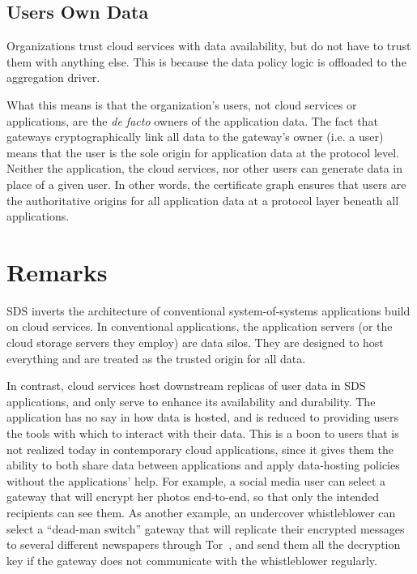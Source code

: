 \subsection{Users Own Data}

Organizations trust cloud services with data availability, but do not have to
trust them with anything else.  This is because the data policy logic is
offloaded to the aggregation driver.

What this means is that the organization's users, not cloud services or
applications, are the \emph{de facto} owners of the application data.  The fact that
gateways cryptographically link all data to the gateway's owner (i.e. a user) 
means that the user is the sole origin for
application data at the protocol level.
Neither the application, the cloud services, nor other users
can generate data in place of a given user.  In other words, the certificate
graph ensures that users are the authoritative origins for all application data
at a protocol layer beneath all applications.

\section{Remarks}

SDS inverts the architecture of conventional system-of-systems applications
build on cloud services.  In conventional
applications, the application servers (or the cloud storage servers they employ)
are data silos.  They are designed to
host everything and are treated as the trusted origin for all data.

In contrast, cloud services host downstream replicas of user
data in SDS applications, and only serve to enhance its availability and durability.  The application has
no say in how data is hosted, and is reduced to providing users the tools with
which to interact with their data.  This is a boon to users that is not realized
today in contemporary cloud applications,
since it gives them the ability to both share data between applications and apply
data-hosting policies without the applications' help.  For example, a social
media user can select a gateway that will encrypt her photos end-to-end, so that
only the intended recipients can see them.  As another example, an undercover
whistleblower can select a ``dead-man switch'' gateway that will replicate their encrypted messages to
several different newspapers through Tor~\cite{tor}, and send them all the decryption key
if the gateway does not communicate with the whistleblower regularly.

